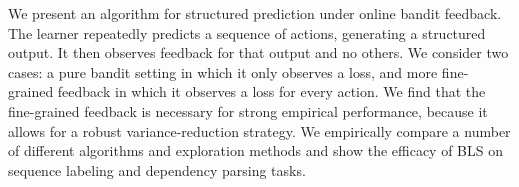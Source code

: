 We present an algorithm for structured prediction under online bandit feedback. The learner repeatedly predicts a sequence of actions, generating a structured output. It then observes feedback for that output and no others. We consider two cases: a pure bandit setting in which it only observes a loss, and more fine-grained feedback in which it observes a loss for every action. We find that the fine-grained feedback is necessary for strong empirical performance, because it allows for a robust variance-reduction strategy. We empirically compare a number of different algorithms and exploration methods and show the efficacy of BLS on sequence labeling and dependency parsing tasks.
